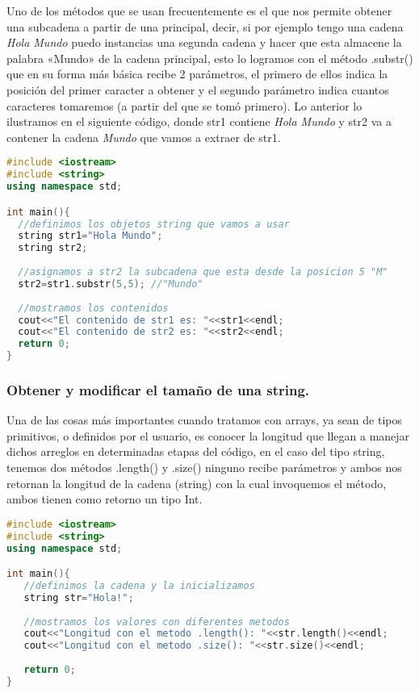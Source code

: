 Uno de los métodos que se usan frecuentemente es el que nos permite obtener una subcadena a partir de una principal, decir, si por ejemplo tengo una cadena \emph{Hola Mundo} puedo instancias una segunda cadena y hacer que esta almacene la palabra «Mundo» de la cadena principal, esto lo logramos con el método .substr() que en su forma más básica recibe 2 parámetros, el primero de ellos indica la posición del primer caracter a obtener y el segundo parámetro indica cuantos caracteres tomaremos (a partir del que se tomó primero). Lo anterior lo ilustramos en el siguiente código, donde str1 contiene \emph{Hola Mundo} y str2 va a contener la cadena \emph{Mundo} que vamos a extraer de str1.

\begin{lstlisting}[language=C++]
#include <iostream>
#include <string>
using namespace std;

int main(){
  //definimos los objetos string que vamos a usar
  string str1="Hola Mundo";
  string str2;
	
  //asignamos a str2 la subcadena que esta desde la posicion 5 "M"
  str2=str1.substr(5,5); //"Mundo"
	
  //mostramos los contenidos
  cout<<"El contenido de str1 es: "<<str1<<endl;
  cout<<"El contenido de str2 es: "<<str2<<endl;
  return 0;
}
\end{lstlisting}

\subsubsection{Obtener y modificar el tamaño de una string.}
Una de las cosas más importantes cuando tratamos con arrays, ya sean de tipos primitivos, o definidos por el usuario, es conocer la longitud que llegan a  manejar dichos arreglos en determinadas etapas del código, en el caso del tipo string, tenemos dos métodos .length() y .size() ninguno recibe parámetros y ambos nos retornan la longitud de la cadena (string) con la cual invoquemos el método, ambos tienen como retorno un tipo Int.

\begin{lstlisting}[language=C++]
#include <iostream>
#include <string>
using namespace std;

int main(){
   //definimos la cadena y la inicializamos
   string str="Hola!";
	
   //mostramos los valores con diferentes metodos
   cout<<"Longitud con el metodo .length(): "<<str.length()<<endl;
   cout<<"Longitud con el metodo .size(): "<<str.size()<<endl;
	
   return 0;
}
\end{lstlisting}

